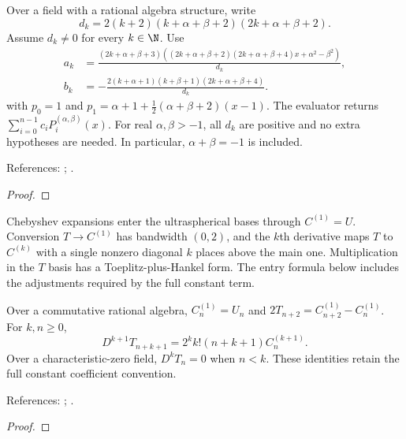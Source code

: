 \begin{supporting}
\begin{theorem}
\label{thm:jacobi-clenshaw}
\leanok
Over a field with a rational algebra structure, write
\[
 d_k=2(k+2)(k+\alpha+\beta+2)(2k+\alpha+\beta+2).
\]
Assume $d_k\ne0$ for every $k\in\N$. Use
\[
\begin{aligned}
 a_k&=\frac{(2k+\alpha+\beta+3)
 ((2k+\alpha+\beta+2)(2k+\alpha+\beta+4)x+\alpha^2-\beta^2)}{d_k},\\
 b_k&=-\frac{2(k+\alpha+1)(k+\beta+1)(2k+\alpha+\beta+4)}{d_k}.
\end{aligned}
\]
with $p_0=1$ and $p_1=\alpha+1+\tfrac12(\alpha+\beta+2)(x-1)$.
The evaluator returns $\sum_{i=0}^{n-1}c_iP_i^{(\alpha,\beta)}(x)$.
For real $\alpha,\beta>-1$, all $d_k$ are positive and no extra hypotheses
are needed. In particular, $\alpha+\beta=-1$ is included.

References: \cite{clenshaw}; \cite[18.9.1--2]{dlmf}.
\end{theorem}
\begin{proof}
\leanok
\end{proof}
\end{supporting}


Chebyshev expansions enter the ultraspherical bases through $C^{(1)}=U$.
Conversion $T\to C^{(1)}$ has bandwidth $(0,2)$, and the $k$th derivative maps
$T$ to $C^{(k)}$ with a single nonzero diagonal $k$ places above the main one.
Multiplication in the $T$ basis has a Toeplitz-plus-Hankel form. The entry
formula below includes the adjustments required by the full constant term.

\begin{theorem}
\label{thm:chebyshev-gegenbauer-entry}
\leanok
Over a commutative rational algebra, $C_n^{(1)}=U_n$ and
$2T_{n+2}=C_{n+2}^{(1)}-C_n^{(1)}$. For $k,n\ge0$,
\[
 D^{k+1}T_{n+k+1}=2^k k!(n+k+1)C_n^{(k+1)}.
\]
Over a characteristic-zero field, $D^kT_n=0$ when $n<k$.
These identities retain the full constant coefficient convention.

References: \cite[18.7.4 and 18.9.9]{dlmf}; \cite[\S2]{olver-townsend}.
\end{theorem}
\begin{proof}
\leanok
\end{proof}

